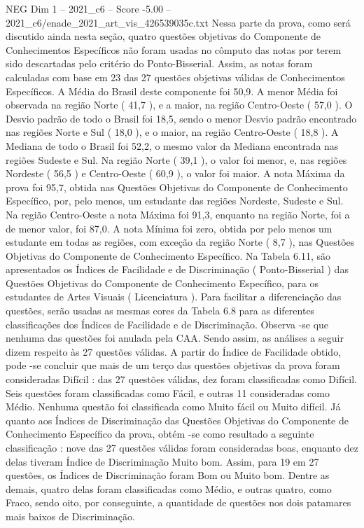 \begin{textsample}{NEG Dim 1 – 2021\_c6 – Score -5.00 – 2021\_c6/enade\_2021\_art\_vis\_426539035c.txt}
Nessa parte da prova, como será discutido ainda nesta seção, quatro questões objetivas do Componente de Conhecimentos Específicos não foram usadas no cômputo das notas por terem sido descartadas pelo critério do Ponto-Bisserial.
Assim, as notas foram calculadas com base em 23 das 27 questões objetivas válidas de Conhecimentos Específicos.
A Média do Brasil deste componente foi 50,9.
A menor Média foi observada na região Norte ( 41,7 ), e a maior, na região Centro-Oeste ( 57,0 ).
O Desvio padrão de todo o Brasil foi 18,5, sendo o menor Desvio padrão encontrado nas regiões Norte e Sul ( 18,0 ), e o maior, na região Centro-Oeste ( 18,8 ).
A Mediana de todo o Brasil foi 52,2, o mesmo valor da Mediana encontrada nas regiões Sudeste e Sul.
Na região Norte ( 39,1 ), o valor foi menor, e, nas regiões Nordeste ( 56,5 ) e Centro-Oeste ( 60,9 ), o valor foi maior.
A nota Máxima da prova foi 95,7, obtida nas Questões Objetivas do Componente de Conhecimento Específico, por, pelo menos, um estudante das regiões Nordeste, Sudeste e Sul.
Na região Centro-Oeste a nota Máxima foi 91,3, enquanto na região Norte, foi a de menor valor, foi 87,0.
A nota Mínima foi zero, obtida por pelo menos um estudante em todas as regiões, com exceção da região Norte ( 8,7 ), nas Questões Objetivas do Componente de Conhecimento Específico.
Na Tabela 6.11, são apresentados os Índices de Facilidade e de Discriminação ( Ponto-Bisserial ) das Questões Objetivas do Componente de Conhecimento Específico, para os estudantes de Artes Visuais ( Licenciatura ).
Para facilitar a diferenciação das questões, serão usadas as mesmas cores da Tabela 6.8 para as diferentes classificações dos Índices de Facilidade e de Discriminação.
Observa -se que nenhuma das questões foi anulada pela CAA.
Sendo assim, as análises a seguir dizem respeito às 27 questões válidas.
A partir do Índice de Facilidade obtido, pode -se concluir que mais de um terço das questões objetivas da prova foram consideradas Difícil : das 27 questões válidas, dez foram classificadas como Difícil.
Seis questões foram classificadas como Fácil, e outras 11 consideradas como Médio.
Nenhuma questão foi classificada como Muito fácil ou Muito difícil.
Já quanto aos Índices de Discriminação das Questões Objetivas do Componente de Conhecimento Específico da prova, obtém -se como resultado a seguinte classificação : nove das 27 questões válidas foram consideradas boas, enquanto dez delas tiveram Índice de Discriminação Muito bom.
Assim, para 19 em 27 questões, os Índices de Discriminação foram Bom ou Muito bom.
Dentre as demais, quatro delas foram classificadas como Médio, e outras quatro, como Fraco, sendo oito, por conseguinte, a quantidade de questões nos dois patamares mais baixos de Discriminação.

\end{textsample}
